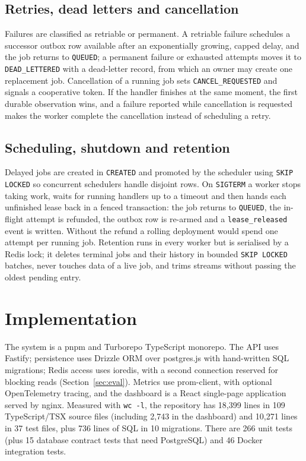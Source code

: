 \documentclass[conference]{IEEEtran}
\newcommand{\code}[1]{\texttt{\small #1}}
\begin{document}
\subsection{Retries, dead letters and cancellation}
Failures are classified as retriable or permanent. A retriable failure schedules a successor outbox row available after an exponentially growing, capped delay, and the job returns to \code{QUEUED}; a permanent failure or exhausted attempts moves it to \code{DEAD\_LETTERED} with a dead-letter record, from which an owner may create one replacement job. Cancellation of a running job sets \code{CANCEL\_REQUESTED} and signals a cooperative token. If the handler finishes at the same moment, the first durable observation wins, and a failure reported while cancellation is requested makes the worker complete the cancellation instead of scheduling a retry.

\subsection{Scheduling, shutdown and retention}
Delayed jobs are created in \code{CREATED} and promoted by the scheduler using \code{SKIP LOCKED} so concurrent schedulers handle disjoint rows. On \code{SIGTERM} a worker stops taking work, waits for running handlers up to a timeout and then hands each unfinished lease back in a fenced transaction: the job returns to \code{QUEUED}, the in-flight attempt is refunded, the outbox row is re-armed and a \code{lease\_released} event is written. Without the refund a rolling deployment would spend one attempt per running job. Retention runs in every worker but is serialised by a Redis lock; it deletes terminal jobs and their history in bounded \code{SKIP LOCKED} batches, never touches data of a live job, and trims streams without passing the oldest pending entry.

\section{Implementation}
The system is a pnpm and Turborepo TypeScript monorepo. The API uses Fastify; persistence uses Drizzle ORM over postgres.js with hand-written SQL migrations; Redis access uses ioredis, with a second connection reserved for blocking reads (Section~\ref{sec:eval}). Metrics use prom-client, with optional OpenTelemetry tracing, and the dashboard is a React single-page application served by nginx. Measured with \code{wc -l}, the repository has 18{,}399 lines in 109 TypeScript/TSX source files (including 2{,}743 in the dashboard) and 10{,}271 lines in 37 test files, plus 736 lines of SQL in 10 migrations. There are 266 unit tests (plus 15 database contract tests that need PostgreSQL) and 46 Docker integration tests.
\end{document}
